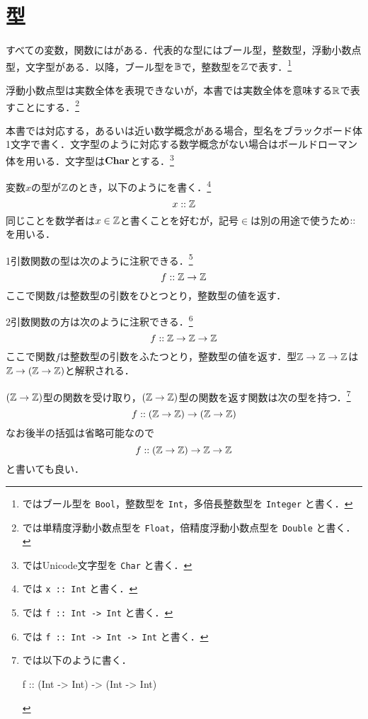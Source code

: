 \documentclass[platex,a5paper,twoside,fleqn,draft]{jsbook}
\newcommand{\keyword}[1]{\textgt{#1}}
\begin{document}
\section{型}

すべての変数，関数には\keyword{型}がある．代表的な型にはブール型，整数型，浮動小数点型，文字型がある．以降，ブール型を$\mathord{\mathbb{B}}$で，整数型を$\mathord{\mathbb{Z}}$で表す．\footnote{\haskell ではブール型を \verb|Bool|，整数型を \verb|Int|，多倍長整数型を \verb|Integer| と書く．}

浮動小数点型は実数全体を表現できないが，本書では実数全体を意味する$\mathord{\mathbb{R}}$で表すことにする．\footnote{\haskell では単精度浮動小数点型を \verb|Float|，倍精度浮動小数点型を \verb|Double| と書く．}

本書では対応する，あるいは近い数学概念がある場合，型名をブラックボード体1文字で書く．文字型のように対応する数学概念がない場合はボールドローマン体を用いる．文字型は$\mathbf{Char}$とする．\footnote{\haskell ではUnicode文字型を \verb|Char| と書く．}

変数$x$の型が$\mathord{\mathbb{Z}}$のとき，以下のように\keyword{型注釈}を書く．\footnote{\haskell では \verb|x :: Int| と書く．}
\begin{equation}
x::\mathord{\mathbb{Z}}
\end{equation}
同じことを数学者は$x\in\mathord{\mathbb{Z}}$と書くことを好むが，記号$\in$は別の用途で使うため$::$を用いる．

1引数関数の型は次のように注釈できる．\footnote{\haskell では \verb|f :: Int -> Int| と書く．}
\begin{equation}
f::\mathord{\mathbb{Z}}\rightarrow\mathord{\mathbb{Z}}
\end{equation}
ここで関数$f$は整数型の引数をひとつとり，整数型の値を返す．

2引数関数の方は次のように注釈できる．\footnote{\haskell では \verb|f :: Int -> Int -> Int| と書く．}
\begin{equation}
f::\mathord{\mathbb{Z}}\rightarrow\mathord{\mathbb{Z}}\rightarrow\mathord{\mathbb{Z}}
\end{equation}
ここで関数$f$は整数型の引数をふたつとり，整数型の値を返す．型$\mathord{\mathbb{Z}}\rightarrow\mathord{\mathbb{Z}}\rightarrow\mathord{\mathbb{Z}}$は$\mathord{\mathbb{Z}}\rightarrow\left(\mathord{\mathbb{Z}}\rightarrow\mathord{\mathbb{Z}}\right)$と解釈される．

$(\mathord{\mathbb{Z}}\rightarrow\mathord{\mathbb{Z}})$型の関数を受け取り，$(\mathord{\mathbb{Z}}\rightarrow\mathord{\mathbb{Z}})$型の関数を返す関数は次の型を持つ．\footnote{\haskell では以下のように書く．
\begin{footcode}
      f :: (Int -> Int) -> (Int -> Int)
\end{footcode}}
\begin{equation}
f::\left(\mathord{\mathbb{Z}}\rightarrow\mathord{\mathbb{Z}}\right)\rightarrow\left(\mathord{\mathbb{Z}}\rightarrow\mathord{\mathbb{Z}}\right)
\end{equation}
なお後半の括弧は省略可能なので
\begin{equation}
f::\left(\mathord{\mathbb{Z}}\rightarrow\mathord{\mathbb{Z}}\right)\rightarrow\mathord{\mathbb{Z}}\rightarrow\mathord{\mathbb{Z}}
\end{equation}
と書いても良い．
\end{document}
